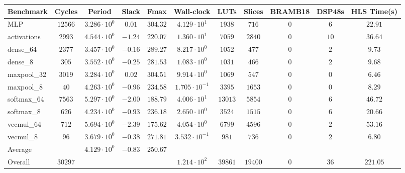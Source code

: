 \begin{tabular}{|l|c|c|c|c|c|c|c|c|c|c|}
\hline
Benchmark   & Cycles    & Period                 & Slack     & Fmax       & Wall-clock              & LUTs      & Slices    & BRAMB18 & DSP48s & HLS Time(s) \\
\hline
MLP         & $ 12566 $ & $ 3.286 \cdot 10^{0} $ & $ 0.01  $ & $ 304.32 $ & $ 4.129 \cdot 10^{1}  $ & $ 1938  $ & $ 716   $ & $ 0   $ & $ 6  $ & $ 22.91   $ \\
activations & $ 2993  $ & $ 4.544 \cdot 10^{0} $ & $ -1.24 $ & $ 220.07 $ & $ 1.360 \cdot 10^{1}  $ & $ 7059  $ & $ 2840  $ & $ 0   $ & $ 10 $ & $ 36.64   $ \\
dense\_64   & $ 2377  $ & $ 3.457 \cdot 10^{0} $ & $ -0.16 $ & $ 289.27 $ & $ 8.217 \cdot 10^{0}  $ & $ 1052  $ & $ 477   $ & $ 0   $ & $ 2  $ & $ 9.73    $ \\
dense\_8    & $ 305   $ & $ 3.552 \cdot 10^{0} $ & $ -0.25 $ & $ 281.53 $ & $ 1.083 \cdot 10^{0}  $ & $ 1031  $ & $ 466   $ & $ 0   $ & $ 2  $ & $ 9.68    $ \\
maxpool\_32 & $ 3019  $ & $ 3.284 \cdot 10^{0} $ & $ 0.02  $ & $ 304.51 $ & $ 9.914 \cdot 10^{0}  $ & $ 1069  $ & $ 547   $ & $ 0   $ & $ 0  $ & $ 6.46    $ \\
maxpool\_8  & $ 40    $ & $ 4.263 \cdot 10^{0} $ & $ -0.96 $ & $ 234.58 $ & $ 1.705 \cdot 10^{-1} $ & $ 3395  $ & $ 1653  $ & $ 0   $ & $ 0  $ & $ 8.29    $ \\
softmax\_64 & $ 7563  $ & $ 5.297 \cdot 10^{0} $ & $ -2.00 $ & $ 188.79 $ & $ 4.006 \cdot 10^{1}  $ & $ 13013 $ & $ 5854  $ & $ 0   $ & $ 6  $ & $ 46.72   $ \\
softmax\_8  & $ 626   $ & $ 4.234 \cdot 10^{0} $ & $ -0.93 $ & $ 236.18 $ & $ 2.650 \cdot 10^{0}  $ & $ 3524  $ & $ 1515  $ & $ 0   $ & $ 6  $ & $ 20.66   $ \\
vecmul\_64  & $ 712   $ & $ 5.694 \cdot 10^{0} $ & $ -2.39 $ & $ 175.62 $ & $ 4.054 \cdot 10^{0}  $ & $ 6799  $ & $ 4596  $ & $ 0   $ & $ 2  $ & $ 53.16   $ \\
vecmul\_8   & $ 96    $ & $ 3.679 \cdot 10^{0} $ & $ -0.38 $ & $ 271.81 $ & $ 3.532 \cdot 10^{-1} $ & $ 981   $ & $ 736   $ & $ 0   $ & $ 2  $ & $ 6.80    $ \\
\hline
Average     & $       $ & $ 4.129 \cdot 10^{0} $ & $ -0.83 $ & $ 250.67 $ & $                     $ & $       $ & $       $ & $     $ & $    $ & $         $ \\
\hline
Overall     & $ 30297 $ & $                    $ & $       $ & $        $ & $ 1.214 \cdot 10^{2}  $ & $ 39861 $ & $ 19400 $ & $ 0   $ & $ 36 $ & $ 221.05  $ \\
\hline
\end{tabular}
